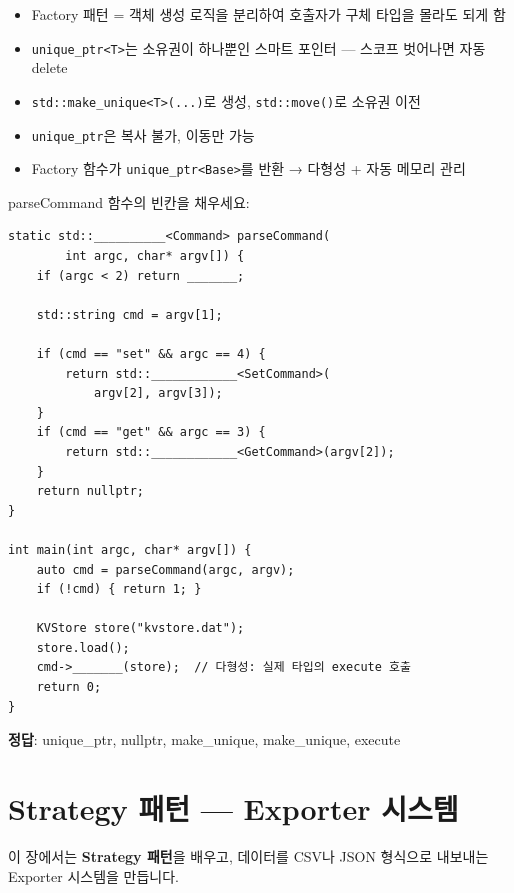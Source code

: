 \documentclass[11pt,a4paper]{book}
\newcommand{\code}[1]{\texttt{#1}}
\begin{document}
\begin{summarybox}
\begin{itemize}[nosep]
\item Factory 패턴 = 객체 생성 로직을 분리하여 호출자가 구체 타입을 몰라도 되게 함
\item \code{unique\_ptr<T>}는 소유권이 하나뿐인 스마트 포인터 — 스코프 벗어나면 자동 delete
\item \code{std::make\_unique<T>(...)}로 생성, \code{std::move()}로 소유권 이전
\item \code{unique\_ptr}은 복사 불가, 이동만 가능
\item Factory 함수가 \code{unique\_ptr<Base>}를 반환 → 다형성 + 자동 메모리 관리
\end{itemize}
\end{summarybox}

\begin{quizbox}
parseCommand 함수의 빈칸을 채우세요:

\begin{lstlisting}[style=cpp,numbers=none]
static std::__________<Command> parseCommand(
        int argc, char* argv[]) {
    if (argc < 2) return _______;

    std::string cmd = argv[1];

    if (cmd == "set" && argc == 4) {
        return std::____________<SetCommand>(
            argv[2], argv[3]);
    }
    if (cmd == "get" && argc == 3) {
        return std::____________<GetCommand>(argv[2]);
    }
    return nullptr;
}

int main(int argc, char* argv[]) {
    auto cmd = parseCommand(argc, argv);
    if (!cmd) { return 1; }

    KVStore store("kvstore.dat");
    store.load();
    cmd->_______(store);  // 다형성: 실제 타입의 execute 호출
    return 0;
}
\end{lstlisting}

\textbf{정답}: unique\_ptr, nullptr, make\_unique, make\_unique, execute
\end{quizbox}

\chapter{Strategy 패턴 — Exporter 시스템}
\label{ch:strategy}

이 장에서는 \textbf{Strategy 패턴}을 배우고, 데이터를 CSV나 JSON 형식으로 내보내는 Exporter 시스템을 만듭니다.
\end{document}
